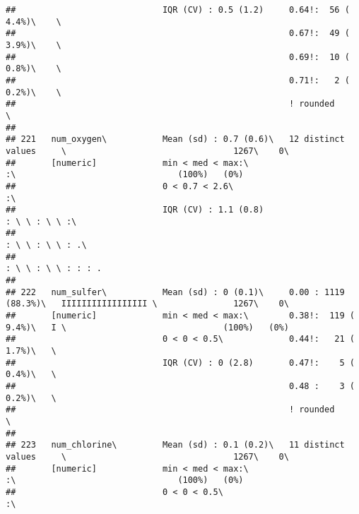 \documentclass[]{article}
\begin{document}
\begin{verbatim}
##                             IQR (CV) : 0.5 (1.2)     0.64!:  56 ( 4.4%)\    \                                                   
##                                                      0.67!:  49 ( 3.9%)\    \                                                   
##                                                      0.69!:  10 ( 0.8%)\    \                                                   
##                                                      0.71!:   2 ( 0.2%)\    \                                                   
##                                                      ! rounded              \                                                   
## 
## 221   num_oxygen\           Mean (sd) : 0.7 (0.6)\   12 distinct values     \                                 1267\    0\       
##       [numeric]             min < med < max:\                               :\                                (100%)   (0%)     
##                             0 < 0.7 < 2.6\                                  :\                                                  
##                             IQR (CV) : 1.1 (0.8)                            : \ \ : \ \ :\                                      
##                                                                             : \ \ : \ \ : .\                                    
##                                                                             : \ \ : \ \ : : : .                                 
## 
## 222   num_sulfer\           Mean (sd) : 0 (0.1)\     0.00 : 1119 (88.3%)\   IIIIIIIIIIIIIIIII \               1267\    0\       
##       [numeric]             min < med < max:\        0.38!:  119 ( 9.4%)\   I \                               (100%)   (0%)     
##                             0 < 0 < 0.5\             0.44!:   21 ( 1.7%)\   \                                                   
##                             IQR (CV) : 0 (2.8)       0.47!:    5 ( 0.4%)\   \                                                   
##                                                      0.48 :    3 ( 0.2%)\   \                                                   
##                                                      ! rounded              \                                                   
## 
## 223   num_chlorine\         Mean (sd) : 0.1 (0.2)\   11 distinct values     \                                 1267\    0\       
##       [numeric]             min < med < max:\                               :\                                (100%)   (0%)     
##                             0 < 0 < 0.5\                                    :\                                                  

\end{verbatim}
\end{document}
